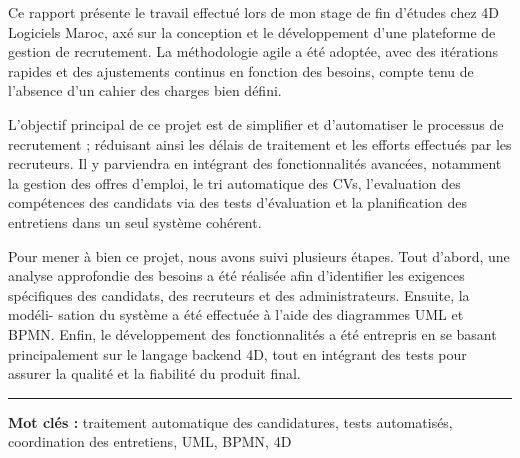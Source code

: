 Ce rapport présente le travail effectué lors de mon stage de fin d’études 
chez 4D Logiciels Maroc, axé sur la conception et le développement 
d’une plateforme de gestion de recrutement. La méthodologie agile 
a été adoptée, avec des itérations rapides et des ajustements 
continus en fonction des besoins, compte tenu de l'absence 
d'un cahier des charges bien défini. 
\newline

L'objectif principal 
de ce projet est de simplifier et d'automatiser le processus de recrutement ; 
réduisant ainsi les délais de traitement et les efforts effectués par les recruteurs. Il y parviendra en intégrant des fonctionnalités avancées, notamment la 
gestion des offres d'emploi, le tri automatique des CVs, l'evaluation des compétences des candidats via des tests d'évaluation 
et la planification des entretiens dans un seul système 
cohérent.
\newline

Pour mener à bien ce projet, nous avons suivi plusieurs étapes. 
Tout d’abord, une analyse approfondie des besoins a été réalisée 
afin d'identifier les exigences spécifiques des candidats, 
des recruteurs et des administrateurs. Ensuite, la modéli-
sation 
du système a été effectuée à l’aide des diagrammes UML et BPMN. 
Enfin, le développement des fonctionnalités a été entrepris en se basant principalement sur le langage backend 4D, tout en intégrant des tests pour assurer la qualité et la fiabilité du produit final.


\vspace{1cm}
\noindent\rule[2pt]{\textwidth}{0.5pt}
\textbf{Mot clés :} traitement automatique des candidatures, tests automatisés, coordination des entretiens, UML, BPMN, 4D
